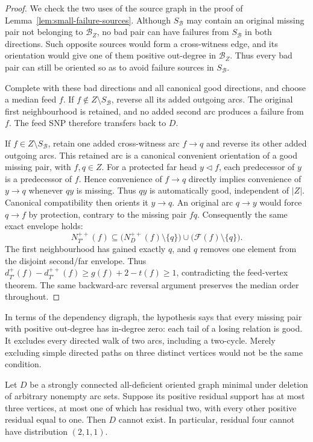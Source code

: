 \begin{proof}
We check the two uses of the source graph in the proof of
Lemma~\ref{lem:small-failure-sources}. Although $S_{\mathcal B}$ may
contain an original missing pair not belonging to $\mathcal B_Z$,
no bad pair can have failures from $S_{\mathcal B}$ in both directions.
Such opposite sources would form a cross-witness edge, and its
orientation would give one of them positive out-degree in
$\mathcal B_Z$. Thus every bad pair can still be oriented so as to
avoid failure sources in $S_{\mathcal B}$.

Complete with these bad directions and all canonical good directions,
and choose a median feed $f$. If $f\notin Z\setminus S_{\mathcal B}$,
reverse all its added outgoing arcs. The original first neighbourhood
is retained, and no added second arc produces a failure from $f$.
The feed SNP therefore transfers back to $D$.

If $f\in Z\setminus S_{\mathcal B}$, retain one added cross-witness
arc $f\to q$ and reverse its other added outgoing arcs. This retained
arc is a canonical convenient orientation of a good missing pair,
with $f,q\in Z$. For a protected far head $y\triangleleft f$, each
predecessor of $y$ is a predecessor of $f$. Hence convenience of
$f\to q$ directly implies convenience of $y\to q$ whenever $qy$
is missing. Thus $qy$ is automatically good, independent of $|Z|$.
Canonical compatibility then orients it $y\to q$. An original arc
$q\to y$ would force $q\to f$ by protection, contrary to the
missing pair $fq$. Consequently the same exact envelope holds:
\[
 N_{T'}^{++}(f)\subseteq
 \bigl(N_D^{++}(f)\setminus\{q\}\bigr)
 \cup\bigl(\mathcal F(f)\setminus\{q\}\bigr).
\]
The first neighbourhood has gained exactly $q$, and $q$ removes one
element from the disjoint second/far envelope. Thus
$d_{T'}^+(f)-d_{T'}^{++}(f)\ge g(f)+2-t(f)\ge1$,
contradicting the feed-vertex theorem. The same backward-arc reversal
argument preserves the median order throughout.
\end{proof}

In terms of the dependency digraph, the hypothesis says that every
missing pair with positive out-degree has in-degree zero: each tail
of a losing relation is good. It excludes every directed walk of two
arcs, including a two-cycle. Merely excluding simple directed paths
on three distinct vertices would not be the same condition.

\begin{proposition}
\label{prop:one-two-unit-source}
Let $D$ be a strongly connected all-deficient oriented graph minimal
under deletion of arbitrary nonempty arc sets. Suppose its positive
residual support has at most three vertices, at most one of which
has residual two, with every other positive residual equal to one.
Then $D$ cannot exist. In particular, residual four cannot have
distribution $(2,1,1)$.
\end{proposition}


